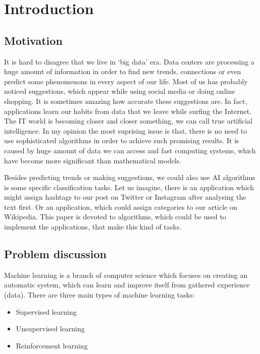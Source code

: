
\chapter{Introduction}

\section{Motivation}

It is hard to disagree that we live in `big data' era. Data centers are processing a huge amount of information in order to find new trends, connections or even predict some phenomenons in every aspect of our life. Most of us has probably noticed suggestions, which appear while using social media or doing online shopping. It is sometimes amazing how accurate these suggestions are. In fact, applications learn our habits from data that we leave while surfing the Internet. The IT world is becoming closer and closer something, we can call true artificial intelligence. In my opinion the most suprising issue is that, there is no need to use sophisticated algorithms in order to achieve such promising results. It is caused by huge amount of data we can access and fast computing systems, which have become more significant than mathematical models.  

Besides predicting trends or making suggestions, we could also use AI algorithms is some specific classification tasks. Let us imagine, there is an application which might assign hashtags to our post on Twitter or Instagram after analysing the text first. Or an application, which could assign categories to our article on Wikipedia. This paper is devoted to algorithms, which could be used to implement the applications, that make this kind of tasks. 

\section{Problem discussion}

Machine learning is a branch of computer science which focuses on creating an automatic system, which can learn and improve itself from gathered experience (data). There are three main types of machine learning tasks:

\begin{itemize}
\item Supervised learning
\item Unsupervised learning
\item Reinforcement learning
\end{itemize}

